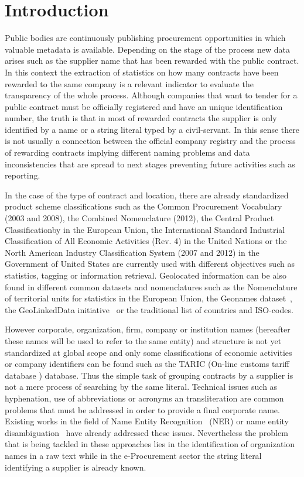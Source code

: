 \documentclass{llncs}
\begin{document}
\section{Introduction}
Public bodies are continuously publishing procurement opportunities in which 
valuable metadata is available. Depending on the stage of the process new data arises such 
as the supplier name that has been rewarded with the public contract. In this 
context the extraction of statistics on how many contracts have been 
rewarded to the same company is a relevant indicator to evaluate the transparency 
of the whole process. Although companies that want to tender for a public contract must be 
officially registered and have an unique identification number, the truth is 
that in most of rewarded contracts the supplier is only identified by a name or a string literal typed 
by a civil-servant. In this sense there is not usually a connection between 
the official company registry and the process of rewarding contracts implying different 
naming problems and data inconsistencies that are spread to next stages preventing future 
activities such as reporting.

In the case of the type of contract and location, there are already standardized~\cite{DBLP:journals/ijseke/AlvarezLSASL12} product 
scheme classifications such as the Common Procurement Vocabulary (2003 and 2008), the Combined Nomenclature (2012), 
the Central Product Classificationby in the European Union, the International Standard Industrial Classification of 
All Economic Activities (Rev. 4) in the United Nations or the North American Industry Classification System (2007 and 2012) 
in the Government of United States are currently used with different objectives such as statistics, tagging or 
information retrieval. Geolocated information can be also found in different common datasets and nomenclatures such as 
the Nomenclature of territorial units for statistics in the European Union, the Geonames dataset~\cite{Geonames}, the GeoLinkedData 
initiative~\cite{DBLP:conf/dexa/Lopez-PellicerSCZM10} or the traditional list of countries and ISO-codes.

However corporate, organization, firm, company or institution names (hereafter these names will be used to refer to 
the same entity) and structure is not yet standardized at global scope and only some classifications of economic activities or 
company identifiers can be found such as the TARIC (On-line customs tariff database ) database. Thus the simple task of grouping contracts by a supplier is not a mere process of 
searching by the same literal. Technical issues such as hyphenation, use of abbreviations or acronyms an transliteration are common problems that must be addressed in order 
to provide a final corporate name. Existing works in the field of Name Entity Recognition~\cite{citeulike:1657521} (NER) or 
name entity disambiguation~\cite{Sarmento:2009:AWN:1602022.1602085,Klein:2003:NER:1119176.1119204} have already addressed these issues. 
Nevertheless the problem that is being tackled in these approaches lies in the identification of organization names in 
a raw text while in the e-Procurement sector the string literal identifying a supplier is already known.
\end{document}
